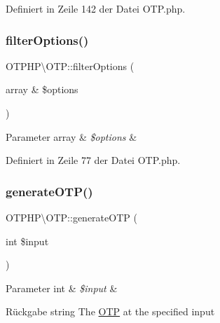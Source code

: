Definiert in Zeile 142 der Datei O\+T\+P.\+php.

\mbox{\label{class_o_t_p_h_p_1_1_o_t_p_abaca8e28e2692474e9c34fc2b24ec86e}} 
\subsubsection{\texorpdfstring{filter\+Options()}{filterOptions()}}
{\footnotesize\ttfamily O\+T\+P\+H\+P\textbackslash{}\+O\+T\+P\+::filter\+Options (\begin{DoxyParamCaption}\item[{array \&}]{\$options }\end{DoxyParamCaption})\hspace{0.3cm}{\ttfamily [protected]}}


\begin{DoxyParams}[1]{Parameter}
array & {\em \$options} & \\
\hline
\end{DoxyParams}


Definiert in Zeile 77 der Datei O\+T\+P.\+php.

\mbox{\label{class_o_t_p_h_p_1_1_o_t_p_a82e51d31ace373dd0ee8b483fc78e77b}} 
\subsubsection{\texorpdfstring{generate\+O\+T\+P()}{generateOTP()}}
{\footnotesize\ttfamily O\+T\+P\+H\+P\textbackslash{}\+O\+T\+P\+::generate\+O\+TP (\begin{DoxyParamCaption}\item[{int}]{\$input }\end{DoxyParamCaption})\hspace{0.3cm}{\ttfamily [protected]}}


\begin{DoxyParams}[1]{Parameter}
int & {\em \$input} & \\
\hline
\end{DoxyParams}
\begin{DoxyReturn}{Rückgabe}
string The \mbox{\hyperlink{class_o_t_p_h_p_1_1_o_t_p}{O\+TP}} at the specified input 
\end{DoxyReturn}


